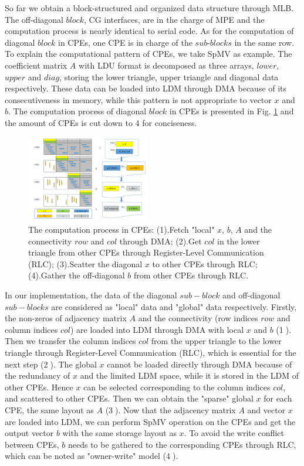 \documentclass[5p,times]{elsarticle}
\begin{document}
So far we obtain a block-structured and organized data structure through MLB. The off-diagonal $block$, CG interfaces, are in the charge of MPE and the computation process is nearly identical to serial code. As for the computation of diagonal $block$ in CPEs, one CPE is in charge of the $sub$-$blocks$ in the same row. To explain the computational pattern of CPEs, we take SpMV as example. The coefficient matrix $A$ with LDU format is decomposed as three arrays, $lower$, $upper$ and $diag$, storing the lower triangle, upper triangle and diagonal data respectively. These data can be loaded into LDM through DMA because of its consecutiveness in memory, while this pattern is not appropriate to vector $x$ and $b$. The computation process of diagonal $block$ in CPEs is presented in Fig. \ref{rlc} and the amount of CPEs is cut down to 4 for conciseness.
\begin{figure}[tbp]
\centerline{\includegraphics[width=0.48\textwidth]{rlc.pdf}}
\caption{The computation process in CPEs: (1).Fetch "local" $x$, $b$, $A$ and the connectivity $row$ and $col$ through DMA; (2).Get $col$ in the lower triangle from other CPEs through Register-Level Communication (RLC); (3).Scatter the diagonal $x$ to other CPEs through RLC; (4).Gather the off-diagonal $b$ from other CPEs through RLC.}
\label{rlc}
\end{figure}
In our implementation, the data of the diagonal $sub-block$ and off-diagonal $sub-blocks$ are considered as "local" data and "global" data respectively. Firstly, the non-zeros of adjacency matrix $A$ and the connectivity (row indices $row$ and column indices $col$) are loaded into LDM through DMA with local $x$ and $b$ (\textcircled{1}). Then we transfer the column indices $col$ from the upper triangle to the lower triangle through Register-Level Communication (RLC), which is essential for the next step (\textcircled{2}). The global $x$ cannot be loaded directly through DMA because of the redundancy of $x$ and the limited LDM space, while it is stored in the LDM of other CPEs. Hence $x$ can be selected corresponding to the column indices $col$, and scattered to other CPEs. Then we can obtain the "sparse" global $x$ for each CPE, the same layout as $A$ (\textcircled{3}). Now that the adjacency matrix $A$ and vector $x$ are loaded into LDM, we can perform SpMV operation on the CPEs and get the output vector $b$ with the same storage layout as $x$. To avoid the write conflict between CPEs, $b$ needs to be gathered to the corresponding CPEs through RLC, which can be noted as "owner-write" model (\textcircled{4}).
\end{document}

